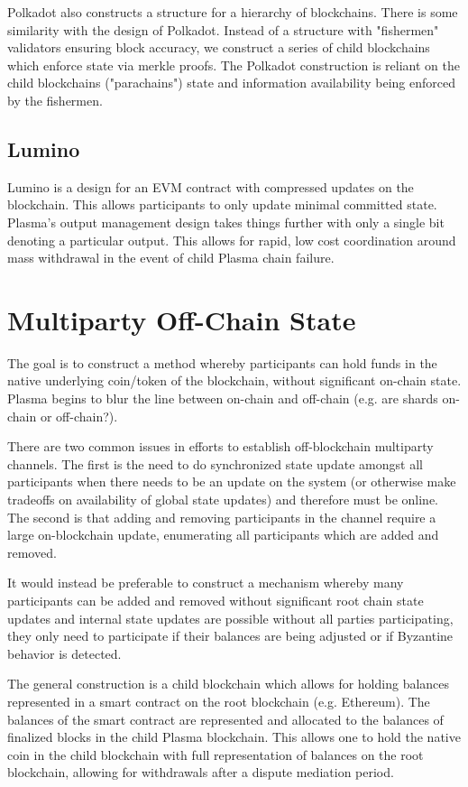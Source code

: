 \documentclass[letterpaper, 11pt]{article}
\begin{document}
Polkadot\cite{polkadot} also constructs a structure for a hierarchy of
blockchains. There is some similarity with the design of Polkadot. Instead of a
structure with "fishermen" validators ensuring block accuracy, we construct a
series of child blockchains which enforce state via merkle proofs. The Polkadot
construction is reliant on the child blockchains ("parachains") state and
information availability being enforced by the fishermen.

\subsection{Lumino}

Lumino\cite{lumino} is a design for an EVM contract with compressed updates on
the blockchain. This allows participants to only update minimal committed
state. Plasma's output management design takes things further with only a
single bit denoting a particular output. This allows for rapid, low cost
coordination around mass withdrawal in the event of child Plasma chain failure.

\section{Multiparty Off-Chain State}

The goal is to construct a method whereby participants can hold funds in the
native underlying coin/token of the blockchain, without significant on-chain
state. Plasma begins to blur the line between on-chain and off-chain (e.g. are
shards on-chain or off-chain?).

There are two common issues in efforts to establish off-blockchain multiparty
channels. The first is the need to do synchronized state update amongst all
participants when there needs to be an update on the system (or otherwise make
tradeoffs on availability of global state updates) and therefore must be online.
The second is that adding and removing participants in the channel require a
large on-blockchain update, enumerating all participants which are added and
removed.

It would instead be preferable to construct a mechanism whereby many
participants can be added and removed without significant root chain state
updates and internal state updates are possible without all parties
participating, they only need to participate if their balances are being
adjusted or if Byzantine behavior is detected.

The general construction is a child blockchain which allows for holding
balances represented in a smart contract on the root blockchain (e.g.
Ethereum). The balances of the smart contract are represented and allocated to
the balances of finalized blocks in the child Plasma blockchain. This allows
one to hold the native coin in the child blockchain with full representation of
balances on the root blockchain, allowing for withdrawals after a dispute
mediation period.
\end{document}
